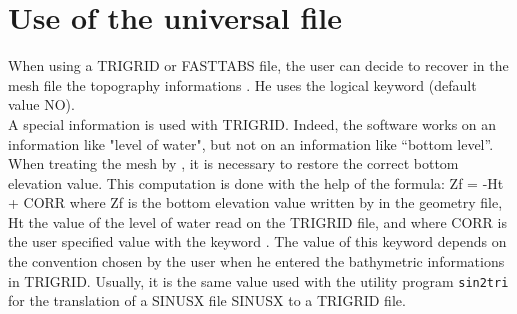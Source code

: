 \section{Use of the universal file}
When using a TRIGRID or FASTTABS file, the user can decide to recover in the
mesh file the topography informations . He uses the logical keyword
 (default value NO).\\
A special information is used with TRIGRID. Indeed, the software works on an
information like "level of water", but not on an information like “bottom
level”. When treating the mesh by \stbtel, it is necessary to restore the
correct bottom elevation value. This computation is done with the help of the
formula: Zf = -Ht + CORR where Zf is the bottom elevation value written by
\stbtel in the geometry file, Ht  the value of the level of water read on the
TRIGRID file, and where CORR  is the user specified value with the keyword
. The value of this keyword depends on the
convention chosen by the user when he entered the bathymetric informations in
TRIGRID. Usually, it is the same value used with the utility program \verb!sin2tri!
for the translation of a SINUSX file SINUSX to a TRIGRID file.
